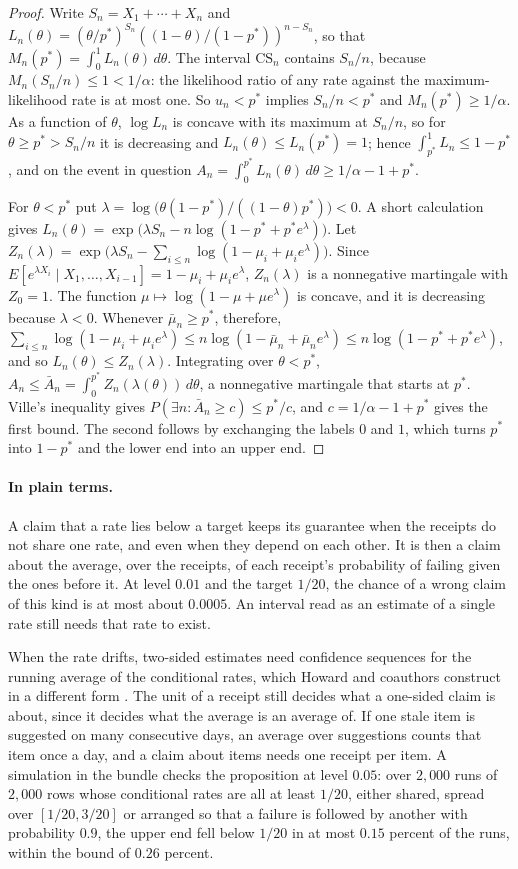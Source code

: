 \documentclass[11pt]{article}
\newcommand{\plain}{\paragraph{In plain terms.}}
\theoremstyle{definition}
\theoremstyle{plain}
\begin{document}
\begin{proof}
Write $S_n=X_1+\cdots+X_n$ and $L_n(\theta)=(\theta/p^*)^{S_n}((1-\theta)/(1-p^*))^{n-S_n}$, so that
$M_n(p^*)=\int_0^1L_n(\theta)\,d\theta$. The interval $\mathrm{CS}_n$ contains $S_n/n$, because
$M_n(S_n/n)\le 1<1/\alpha$: the likelihood ratio of any rate against the maximum-likelihood rate is
at most one. So $u_n<p^*$ implies $S_n/n<p^*$ and $M_n(p^*)\ge1/\alpha$. As a function of $\theta$,
$\log L_n$ is concave with its maximum at $S_n/n$, so for $\theta\ge p^*>S_n/n$ it is decreasing and
$L_n(\theta)\le L_n(p^*)=1$; hence $\int_{p^*}^1L_n\le 1-p^*$, and on the event in question
$A_n=\int_0^{p^*}L_n(\theta)\,d\theta\ge 1/\alpha-1+p^*$.

For $\theta<p^*$ put $\lambda=\log\bigl(\theta(1-p^*)/((1-\theta)p^*)\bigr)<0$. A short calculation gives
$L_n(\theta)=\exp\bigl(\lambda S_n-n\log(1-p^*+p^*e^\lambda)\bigr)$. Let
$Z_n(\lambda)=\exp\bigl(\lambda S_n-\sum_{i\le n}\log(1-\mu_i+\mu_ie^\lambda)\bigr)$. Since
$E[e^{\lambda X_i}\mid X_1,\ldots,X_{i-1}]=1-\mu_i+\mu_ie^\lambda$, $Z_n(\lambda)$ is a nonnegative
martingale with $Z_0=1$. The function $\mu\mapsto\log(1-\mu+\mu e^\lambda)$ is concave, and it is
decreasing because $\lambda<0$. Whenever $\bar\mu_n\ge p^*$, therefore,
$\sum_{i\le n}\log(1-\mu_i+\mu_ie^\lambda)\le n\log(1-\bar\mu_n+\bar\mu_ne^\lambda)\le
n\log(1-p^*+p^*e^\lambda)$, and so $L_n(\theta)\le Z_n(\lambda)$. Integrating over $\theta<p^*$,
$A_n\le\bar A_n=\int_0^{p^*}Z_n(\lambda(\theta))\,d\theta$, a nonnegative martingale that starts at
$p^*$. Ville's inequality gives $P(\exists n:\bar A_n\ge c)\le p^*/c$, and $c=1/\alpha-1+p^*$ gives
the first bound. The second follows by exchanging the labels $0$ and $1$, which turns $p^*$ into
$1-p^*$ and the lower end into an upper end.
\end{proof}

\plain A claim that a rate lies below a target keeps its guarantee when the receipts do not share
one rate, and even when they depend on each other. It is then a claim about the average, over the
receipts, of each receipt's probability of failing given the ones before it. At level $0.01$ and the
target $1/20$, the chance of a wrong claim of this kind is at most about $0.0005$. An interval read as
an estimate of a single rate still needs that rate to exist.

When the rate drifts, two-sided estimates need confidence sequences for the running average of the
conditional rates, which Howard and coauthors construct in a different form \cite{howard}. The unit
of a receipt still decides what a one-sided claim is about, since it decides what the average is an
average of. If one stale item is suggested on many consecutive days, an average over suggestions counts that
item once a day, and a claim about items needs one receipt per item. A simulation in the bundle
checks the proposition at level $0.05$: over $2{,}000$ runs of $2{,}000$ rows whose conditional
rates are all at least $1/20$, either shared, spread over $[1/20,3/20]$ or arranged so that a failure
is followed by another with probability $0.9$, the upper end fell below $1/20$ in at most $0.15$
percent of the runs, within the bound of $0.26$ percent.
\end{document}
